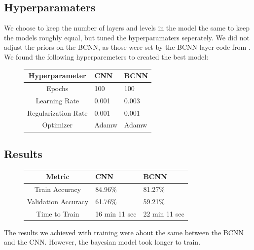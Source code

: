 \documentclass[12pt]{article}
\begin{document}
\subsection{Hyperparamaters}

We choose to keep the number of layers and levels in the model the same to keep the models roughly equal, but tuned the hyperparamaters seperately. We did not adjust the priors on the BCNN, as those were set by the BCNN layer code from \cite{shridhar2018uncertainty}. We found the following hyperparemeters to created the best model:

\begin{figure}[H]
	\begin{center}
	\begin{tabular}{|c||p{3cm}|p{3cm}|} %
	\hline
	\textbf{Hyperparameter} & \textbf{CNN} & \textbf{BCNN} \\ [0.5ex] 
	\hline\hline
	Epochs & 100 & 100\\
	\hline
	Learning Rate & 0.001  & 0.003  \\
	\hline
	Regularization Rate& 0.001 & 0.001 \\
	\hline
	Optimizer & Adamw  & Adamw  \\
	\hline
\end{tabular}
\end{center}
\end{figure}



\subsection{Results}

\begin{figure}[H]
	\centering
	\begin{tabular}{|c||p{3cm}|p{3cm}|} %
		\hline
		\textbf{Metric} & \textbf{CNN} & \textbf{BCNN} \\ [0.5ex] 
		\hline\hline
		Train Accuracy & 84.96\% & 81.27\%\\
		\hline
		Validation Accuracy & 61.76\%  & 59.21\%  \\
		\hline
		Time to Train & 16 min 11 sec  & 22 min 11 sec  \\
		\hline
	\end{tabular}
\end{figure}

The results we achieved with training were about the same between the BCNN and the CNN. However, the bayesian model took longer to train.
\end{document}
